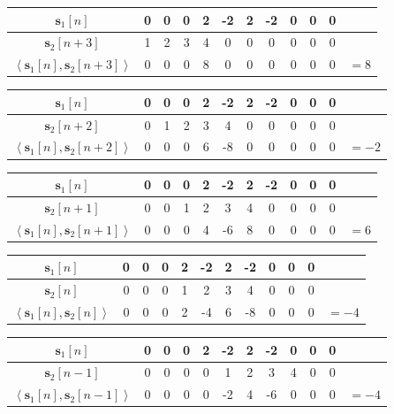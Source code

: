 \documentclass[]{article}
\newcommand{\iprod}[2]{\left\langle #1, #2 \right\rangle}
\renewcommand{\vec}[1]{\mathbf{#1}}
\begin{document}
\begin{flushleft}
\begin{tabular}{c|ccccccccccc}
	\(\vec{s}_1[n]\) & 0 & 0 & 0 & 2 & -2 & 2 & -2 & 0 & 0 & 0 \\
	\hline
	\(\vec{s}_2[n + 3]\) & 1 & 2 & 3 & 4 & 0 & 0 & 0 & 0 & 0 & 0 \\
	\hline
	\(\iprod{\vec{s}_1[n]}{\vec{s}_2[n + 3]}\) & 0 & 0 & 0 & 8 & 0 & 0 & 0 & 0 & 0 & 0 & \(= 8\) \\
\end{tabular} \vspace{5 mm}
\begin{tabular}{c|ccccccccccc}
	\(\vec{s}_1[n]\) & 0 & 0 & 0 & 2 & -2 & 2 & -2 & 0 & 0 & 0 \\
	\hline
	\(\vec{s}_2[n + 2]\) & 0 & 1 & 2 & 3 & 4 & 0 & 0 & 0 & 0 & 0 \\
	\hline
	\(\iprod{\vec{s}_1[n]}{\vec{s}_2[n + 2]}\) & 0 & 0 & 0 & 6 & -8 & 0 & 0 & 0 & 0 & 0 & \(= -2\) \\
\end{tabular} \vspace{5 mm}
\begin{tabular}{c|ccccccccccc}
	\(\vec{s}_1[n]\) & 0 & 0 & 0 & 2 & -2 & 2 & -2 & 0 & 0 & 0 \\
	\hline
	\(\vec{s}_2[n + 1]\) & 0 & 0 & 1 & 2 & 3 & 4 & 0 & 0 & 0 & 0 \\
	\hline
	\(\iprod{\vec{s}_1[n]}{\vec{s}_2[n + 1]}\) & 0 & 0 & 0 & 4 & -6 & 8 & 0 & 0 & 0 & 0 & \(= 6\) \\
\end{tabular} \vspace{5 mm}
\begin{tabular}{c|ccccccccccc}
	\(\vec{s}_1[n]\) & 0 & 0 & 0 & 2 & -2 & 2 & -2 & 0 & 0 & 0 \\
	\hline
	\(\vec{s}_2[n]\) & 0 & 0 & 0 & 1 & 2 & 3 & 4 & 0 & 0 & 0 \\
	\hline
	\(\iprod{\vec{s}_1[n]}{\vec{s}_2[n]}\) & 0 & 0 & 0 & 2 & -4 & 6 & -8 & 0 & 0 & 0 & \(= -4\) \\
\end{tabular} \vspace{5 mm}
\begin{tabular}{c|ccccccccccc}
	\(\vec{s}_1[n]\) & 0 & 0 & 0 & 2 & -2 & 2 & -2 & 0 & 0 & 0 \\
	\hline
	\(\vec{s}_2[n - 1]\) & 0 & 0 & 0 & 0 & 1 & 2 & 3 & 4 & 0 & 0 \\
	\hline
	\(\iprod{\vec{s}_1[n]}{\vec{s}_2[n - 1]}\) & 0 & 0 & 0 & 0 & -2 & 4 & -6 & 0 & 0 & 0 & \(= -4\) \\

\end{tabular}
\end{flushleft}
\end{document}
